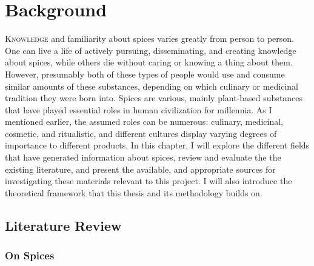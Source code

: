 \chapter{Background}
\label{ch:background}


\lettrine[lines=\iniciale]{\textcolor{\accentcolor}{K}}{nowledge} and familiarity about spices varies greatly from person to person. One can live a life of actively pursuing, disseminating, and creating knowledge about spices, while others die without caring or knowing a thing about them. However, presumably both of these types of people would use and consume similar amounts of these substances, depending on which culinary or medicinal tradition they were born into. Spices are various, mainly plant-based substances that have played essential roles in human civilization for millennia. As I mentioned earlier, the assumed roles can be numerous: culinary, medicinal, cosmetic, and ritualistic, and different cultures display varying degrees of importance to different products. 
In this chapter, I will explore the different fields that have generated information about spices, review and evaluate the the existing literature, and present the available, and appropriate sources for investigating these materials relevant to this project. I will also introduce the theoretical framework that this thesis and its methodology builds on.

\section{Literature Review}

\subsection{On Spices}

